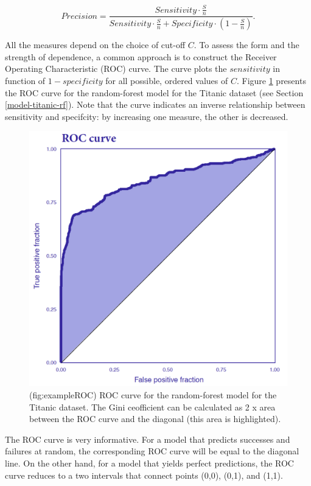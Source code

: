 \documentclass[12pt,]{krantz}
\begin{document}
\[
Precision = \frac{Sensitivity \cdot \frac{S}{n}}{Sensitivity \cdot \frac{S}{n}+Specificity \cdot \left(1-\frac{S}{n}\right)}.
\]

All the measures depend on the choice of cut-off \(C\). To assess the form and the strength of dependence, a common approach is to construct the Receiver Operating Characteristic (ROC) curve. The curve plots the \(sensitivity\) in function of \(1-specificity\) for all possible, ordered values of \(C\). Figure \ref{fig:exampleROC} presents the ROC curve for the random-forest model for the Titanic dataset (see Section \ref{model-titanic-rf}). Note that the curve indicates an inverse relationship between sensitivity and specifcity: by increasing one measure, the other is decreased.

\begin{figure}

{\centering \includegraphics[width=0.8\linewidth]{figure/ROCcurve} 

}

\caption{(fig:exampleROC) ROC curve for the random-forest model for the Titanic dataset. The Gini ceofficient can be calculated as 2 x area between the ROC curve and the diagonal (this area is highlighted).}\label{fig:exampleROC}
\end{figure}

The ROC curve is very informative. For a model that predicts successes and failures at random, the corresponding ROC curve will be equal to the diagonal line. On the other hand, for a model that yields perfect predictions, the ROC curve reduces to a two intervals that connect points (0,0), (0,1), and (1,1).
\end{document}
